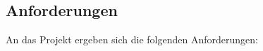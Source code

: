 \subsection{Anforderungen}
An das Projekt ergeben sich die folgenden Anforderungen:
\begin{compactitem}
	\item  
\end{compactitem}